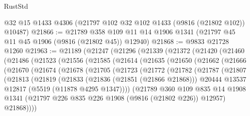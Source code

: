 \begin{lexlean}{RustStd}
\begin{coremodule}
    @32
    @15
    @1433
    @4306
    (@21797 @102 @32 @102 @1433 (@9816 (@21802 @102)) @10487)
@21866 := @21789
    @358
    @109
    @11
    @14
    @1906
    @1341
    (@21797 @45 @11 @45 @1906 (@9816 (@21802 @45)) @12940)
@21868 := @9833 @21728 @1260
@21963 := @21189
    (@21247
      (@21296
        (@21339
          (@21372
            (@21420
              (@21460
                (@21486
                  (@21523
                    (@21556
                      (@21585
                        (@21614
                          (@21635
                            (@21650
                              (@21662
                                (@21666
                                  (@21670
                                    (@21674
                                      (@21678
                                        (@21705
                                          (@21723
                                            (@21772
                                              (@21782
                                                (@21787
                                                  (@21807
                                                    (@21813
                                                      (@21819
                                                        (@21833
                                                          (@21836 (@21851 (@21866 @21868)))
                                                          @20444
                                                          @13537
                                                          @12817
                                                          (@5519 (@11878 @4295 @1347))))
                                                      (@21789
                                                        @360
                                                        @109
                                                        @835
                                                        @14
                                                        @1908
                                                        @1341
                                                        (@21797
                                                          @226
                                                          @835
                                                          @226
                                                          @1908
                                                          (@9816 (@21802 @226))
                                                          @12957)
                                                        @21868))))

\end{coremodule}
\end{lexlean}
